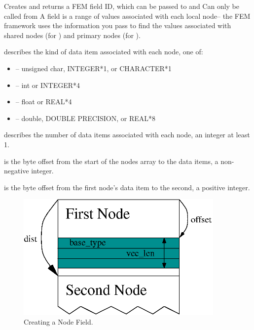 \documentclass[10pt]{article}
\begin{document}

     Creates and returns a FEM field ID, which can be passed to
 and   Can only be called from
  A field is a range of values associated with each local node--
the FEM framework uses the information you pass to find the values associated
with shared nodes (for ) and primary nodes (for
).

      describes the kind of data item associated with each
     node, one of:

     \begin{itemize}
        \item {}-- unsigned char, INTEGER*1, or CHARACTER*1
        \item {}-- int or INTEGER*4
        \item {}-- float or REAL*4
        \item {}-- double, DOUBLE PRECISION, or REAL*8
     \end{itemize}

      describes the number of data items associated with each
     node, an integer at least 1.

      is the byte offset from the start of the nodes array to the
     data items, a non-negative integer.

      is the byte offset from the first node's data item to the
     second, a positive integer.

\begin{figure}[h]
\begin{center}
\includegraphics[width=4in]{create_field}
\end{center}
\caption{Creating a Node Field.}
\label{fig:createfield}
\end{figure}
\end{document}
